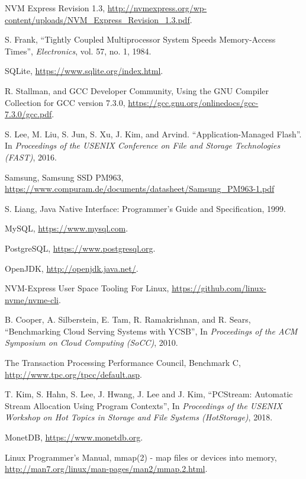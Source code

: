 \begin{thebibliography}{00}
NVM Express Revision 1.3,
\url{http://nvmexpress.org/wp-content/uploads/NVM_Express_Revision_1.3.pdf}.

S. Frank,
``Tightly Coupled Multiprocessor System Speeds Memory-Access Times'',
\textit{Electronics}, vol. 57, no. 1, 1984.

SQLite,
\url{https://www.sqlite.org/index.html}.


R. Stallman, and GCC Developer Community,
Using the GNU Compiler Collection for GCC version 7.3.0,
\url{https://gcc.gnu.org/onlinedocs/gcc-7.3.0/gcc.pdf}.

S. Lee, M. Liu, S. Jun, S. Xu, J. Kim, and Arvind.
``Application-Managed Flash''.
In \textit{Proceedings of the USENIX Conference on File and Storage
Technologies (FAST)}, 2016.


Samsung, Samsung SSD PM963, 
\url{https://www.compuram.de/documents/datasheet/Samsung_PM963-1.pdf}

S. Liang,
Java Native Interface: Programmer's Guide and Specification,
1999.

MySQL,
\url{https://www.mysql.com}.

PostgreSQL,
\url{https://www.postgresql.org}.

OpenJDK,
\url{http://openjdk.java.net/}.

NVM-Express User Space Tooling For Linux,
\url{https://github.com/linux-nvme/nvme-cli}.

B. Cooper, A. Silberstein, E. Tam, R. Ramakrishnan, and R. Sears,
``Benchmarking Cloud Serving Systems with YCSB'',
In \textit{Proceedings of the ACM Symposium on Cloud Computing (SoCC)}, 2010.

The Transaction Processing Performance Council,
Benchmark C,
\url{http://www.tpc.org/tpcc/default.asp}. 

T. Kim, S. Hahn, S. Lee, J. Hwang, J. Lee and J. Kim,
``PCStream: Automatic Stream Allocation Using Program Contexts'',
In \textit{Proceedings of the USENIX Workshop on Hot Topics in Storage
and File Systems (HotStorage)}, 2018.

MonetDB,
\url{https://www.monetdb.org}.

Linux Programmer's Manual,
mmap(2) - map files or devices into memory,
\url{http://man7.org/linux/man-pages/man2/mmap.2.html}.



\end{thebibliography}
